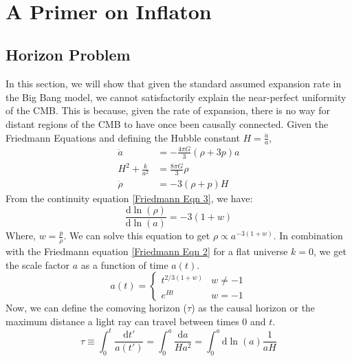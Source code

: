 \documentclass[aps,prd,reprint,preprintnumbers,showpacs,floatfix,nofootinbib,superscript address]{revtex4-2}
\newcommand{\wb}[1]{{\color[RGB]{255,0,0}{\textbf{\textit{[WB: #1]}}}}}
\newcommand{\pcs}[1]{{\color[RGB]{0,100,0}{\textbf{\textit{[PCS: #1]}}}}}
\begin{document}

\newpage
\,\,
\newpage

\appendix
\section{A Primer on Inflaton}\label{The need for Inflation}

\subsection{Horizon Problem} \label{Horizon Problem}
In this section, we will show that given the standard assumed expansion rate in the Big Bang model, we cannot satisfactorily explain the near-perfect uniformity of the CMB. This is because, given the rate of expansion, there is no way for distant regions of the CMB to have once been causally connected.
Given the Friedmann Equations and defining the Hubble constant $H = \frac{\dot{a}}{a}$,
\begin{align}    
    \ddot{a} &= -\frac{4\pi G}{3} (\rho + 3p)a \label{Friedmann Eqn 1} \\
    H^2 + \frac{k}{a^2} &= \frac{8 \pi G}{3} \rho \label{Friedmann Eqn 2} \\
    \dot{\rho} &= -3(\rho + p)H \label{Friedmann Eqn 3}
\end{align}
From the continuity equation \cref{Friedmann Eqn 3}, we have:
\begin{equation} \label{4}
    \frac{\mathrm{d}  \ln(\rho)}{\mathrm{d} \ln(a)} = -3(1+w)
\end{equation}
Where, $w = \frac{p}{\rho}$. We can solve this equation to get $\rho \propto a^{-3(1+w)}$. In combination with the Friedmann equation \cref{Friedmann Eqn 2} for a flat universe $k = 0$, we get the scale factor $a$ as a function of time $a(t)$.
\begin{equation}    \label{5}
    a(t) = \begin{cases}
        t^{2/3(1+w)} & w \neq -1 \\
        e^{Ht} & w = -1
    \end{cases}
\end{equation}
Now, we can define the comoving horizon ($\tau$) as the causal horizon or the maximum distance a light ray can travel between times 0 and $t$.
\begin{equation}    \label{6}
    \tau \equiv \int_{0}^{t} \frac{\mathrm{d} t'}{a(t')} = \int_{0}^{a} \frac{\mathrm{d}a}{H a^2} = \int_{0}^{a} \mathrm{d} \ln(a) \frac{1}{aH}
\end{equation}
\end{document}
